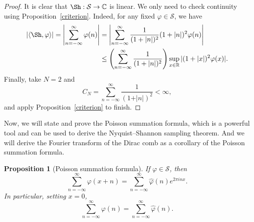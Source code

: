 \documentclass[12pt, letterpaper]{article}
\theoremstyle{plain}
\newtheorem{proposition}[theorem]{Proposition}
\renewcommand{\phi}{\varphi}
\begin{document}
\begin{proof}
    It is clear that $\Sh: \mathcal{S} \to \mathbb{C}$ is linear. We only need to check continuity using Proposition~\ref{criterion}. Indeed, for any fixed $\phi \in \mathcal{S}$, we have
    \begin{align}
        \vert\langle \Sh, \phi \rangle\vert = \left\vert \sum_{n = -\infty}^\infty \phi(n) \right\vert & = \left\vert \sum_{n = -\infty}^\infty \frac{1}{(1 + \vert n\vert)^2} (1 + \vert n\vert)^2 \phi(n) \right\vert \\
        & \le \left( \sum_{n = -\infty}^\infty \frac{1}{(1 + \vert n\vert)^2} \right) \sup_{x \in \mathbb{R}} \vert(1 + \vert x\vert)^2 \phi(x)\vert.
    \end{align}
    Finally, take $N = 2$ and 
    \begin{equation}
        C_N = \sum_{n = -\infty}^\infty \frac{1}{(1 + \vert n\vert)^2} < \infty,
    \end{equation}
    and apply Proposition~\ref{criterion} to finish.
\end{proof}

Now, we will state and prove the Poisson summation formula, which is a powerful tool and can be used to derive the Nyquist–Shannon sampling theorem. And we will derive the Fourier transform of the Dirac comb as a corollary of the Poisson summation formula.

\begin{proposition}[Poisson summation formula]\label{psf}
    If $\phi \in \mathcal{S}$, then
    \begin{equation}
        \sum_{n = -\infty}^\infty \phi(x + n) = \sum_{n = -\infty}^\infty \hat{\phi}(n)e^{2\pi inx}.
    \end{equation}
    In particular, setting $x = 0$,
    \begin{equation}
        \sum_{n = -\infty}^\infty \phi(n) = \sum_{n = -\infty}^\infty \hat{\phi}(n).
    \end{equation}
\end{proposition}
\end{document}
